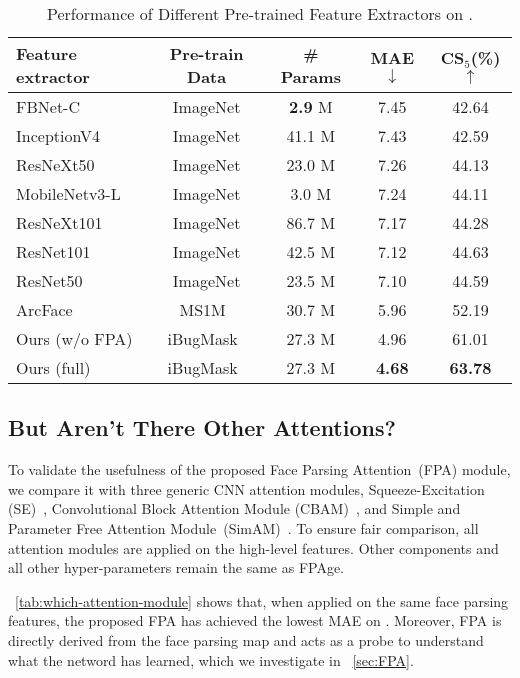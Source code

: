 \begin{table}[h]
    \caption{Performance of Different Pre-trained Feature Extractors on \imdbc.}
    \label{tab:which-feature-extractor}
    \centering
    \begin{tabular}{l|c|c|c|c}
    \toprule
        Feature extractor & Pre-train Data & \# Params & MAE $\downarrow$ & CS$_5$(\%) $\uparrow$ \\ \hline
        FBNet-C & ImageNet  & \textbf{2.9} M & 7.45 & 42.64 \\
        InceptionV4& ImageNet  & 41.1 M & 7.43 & 42.59 \\
        ResNeXt50& ImageNet & 23.0 M & 7.26 & 44.13 \\
        MobileNetv3-L& ImageNet  & 3.0 M & 7.24 & 44.11 \\
        ResNeXt101& ImageNet & 86.7 M & 7.17 & 44.28 \\ 
        ResNet101& ImageNet & 42.5 M & 7.12 & 44.63 \\
        ResNet50& ImageNet & 23.5 M & 7.10 & 44.59 \\
        ArcFace~\cite{deng2018arcface}& MS1M~\cite{guo2016ms1m} & 30.7 M & 5.96 & 52.19 \\ \hline
        Ours (w/o FPA) & iBugMask~\cite{linRoITanhpolarTransformer2021} & 27.3 M & 4.96 & 61.01 \\ 
        Ours (full) & iBugMask~\cite{linRoITanhpolarTransformer2021} & 27.3 M & \textbf{4.68} & \textbf{63.78} \\ 
    \bottomrule
    \end{tabular}
\end{table}






\subsection{But Aren't There Other Attentions?}
To validate the usefulness of the proposed Face Parsing Attention~(FPA) module, we compare it with three generic CNN attention modules, Squeeze-Excitation (SE)~\cite{Hu_2018_CVPR}, Convolutional Block Attention Module (CBAM)~\cite{Woo_2018_ECCV}, and Simple and Parameter Free Attention Module~(SimAM)~\cite{SimAM}. 
To ensure fair comparison, all attention modules are applied on the high-level features. Other components and all other hyper-parameters remain the same as FPAge.

\tableautorefname~\ref{tab:which-attention-module} shows that, when applied on the same face parsing features, the proposed FPA has achieved the lowest MAE on \imdbc. Moreover, FPA is directly derived from the face parsing map and acts as a probe to understand what the netword has learned, which we investigate in \sectionautorefname~\ref{sec:FPA}. 

